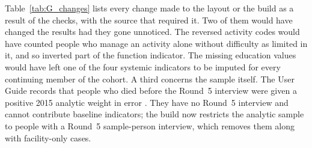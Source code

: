 Table~\ref{tab:G_changes} lists every change made to the layout or the build
as a result of the checks, with the source that required it. Two of them would
have changed the results had they gone unnoticed. The reversed activity codes
would have counted people who manage an activity alone without difficulty as
limited in it, and so inverted part of the function indicator. The missing
education values would have left one of the four systemic indicators to be
imputed for every continuing member of the cohort. A third
concerns the sample itself. The User Guide records that people who died before
the Round~5 interview were given a positive 2015 analytic weight in error
\citep{freedman_nhats_userguide_2026}. They have no Round~5 interview and
cannot contribute baseline indicators; the build now restricts the analytic
sample to people with a Round~5 sample-person interview, which removes them
along with facility-only cases.

